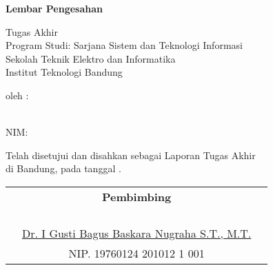 \clearpage
\pagestyle{empty}

\begin{center}
\smallskip

    {\Large \bfseries Lembar Pengesahan}

    \MakeUppercase{\normalsize \bfseries \thetitle}
    \vfill

    \normalsize Tugas Akhir \\
    Program Studi: Sarjana Sistem dan Teknologi Informasi \\
    Sekolah Teknik Elektro dan Informatika \\
    Institut Teknologi Bandung \\
    \vfill

    \normalsize oleh :

    \normalsize \theauthor \\
    \normalsize NIM: \nim

    \vfill
    \normalsize \normalfont
    Telah disetujui dan disahkan sebagai Laporan Tugas Akhir \\
    di Bandung, pada tanggal \thedate{} \yearsidang{}.

    \vfill
    \setlength{\tabcolsep}{12pt}
    \begin{tabularx}{\textwidth}{c@{\hskip 0.2\textwidth}cc@{\hskip 0.3\textwidth}}
        & {\bfseries Pembimbing} & \\
        & & \\
        & & \\
        & & \\
        & & \\
        & \underline{Dr. I Gusti Bagus Baskara Nugraha S.T., M.T.} & \\
        & NIP. 19760124 201012 1 001 & 
    \end{tabularx}

\end{center}
\clearpage
